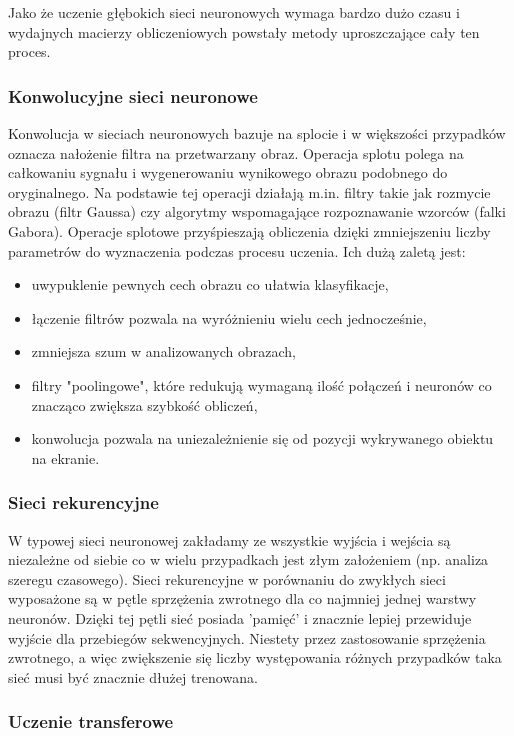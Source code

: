 Jako że uczenie głębokich sieci neuronowych wymaga bardzo dużo czasu i wydajnych macierzy obliczeniowych powstały metody uproszczające cały ten proces. 
\subsubsection{Konwolucyjne sieci neuronowe}
Konwolucja w sieciach neuronowych bazuje na splocie i w większości przypadków oznacza nałożenie filtra na przetwarzany obraz. Operacja splotu polega na całkowaniu sygnału i wygenerowaniu wynikowego obrazu podobnego do oryginalnego.
Na podstawie tej operacji działają m.in. filtry takie jak rozmycie obrazu (filtr Gaussa) czy  algorytmy wspomagające rozpoznawanie wzorców (falki Gabora).
Operacje splotowe przyśpieszają obliczenia dzięki zmniejszeniu liczby parametrów do wyznaczenia podczas procesu uczenia. Ich dużą zaletą jest:
\begin{itemize}
	\item uwypuklenie pewnych cech obrazu co ułatwia klasyfikacje, 
	\item łączenie filtrów pozwala na wyróżnieniu wielu cech jednocześnie, 
	\item zmniejsza szum w analizowanych obrazach, 
	\item filtry "poolingowe", które redukują wymaganą ilość połączeń i neuronów co znacząco zwiększa szybkość obliczeń, 
	\item konwolucja pozwala na uniezależnienie się od pozycji wykrywanego obiektu na ekranie.
\end{itemize}
\subsubsection{Sieci rekurencyjne}

W typowej sieci neuronowej zakładamy ze wszystkie wyjścia i wejścia są niezależne od siebie co w wielu 
przypadkach jest złym założeniem (np. analiza szeregu czasowego). Sieci rekurencyjne w porównaniu do zwykłych sieci 
wyposażone są w pętle sprzężenia zwrotnego dla co najmniej jednej warstwy neuronów. Dzięki tej pętli sieć posiada 'pamięć' 
 i znacznie lepiej przewiduje wyjście dla przebiegów sekwencyjnych. Niestety przez zastosowanie sprzężenia zwrotnego, a więc zwiększenie
się liczby występowania różnych przypadków taka sieć musi być znacznie dłużej trenowana.

\subsubsection{Uczenie transferowe}

